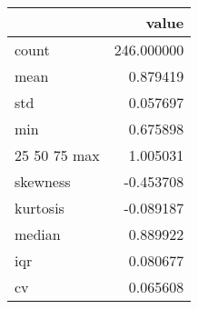 \begin{tabular}{lr}
\toprule
 & value \\
\midrule
count & 246.000000 \\
mean & 0.879419 \\
std & 0.057697 \\
min & 0.675898 \\
25%
50%
75%
max & 1.005031 \\
skewness & -0.453708 \\
kurtosis & -0.089187 \\
median & 0.889922 \\
iqr & 0.080677 \\
cv & 0.065608 \\
\bottomrule
\end{tabular}
